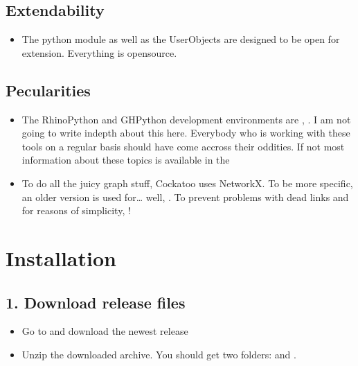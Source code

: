 \documentclass[letterpaper,10pt,english]{sphinxmanual}
\begin{document}
\subsection{Extendability}
\label{\detokenize{README:extendability}}\begin{itemize}
\item {} 
The python module as well as the UserObjects are designed to be open
for extension. Everything is open\sphinxhyphen{}source.

\end{itemize}


\subsection{Pecularities}
\label{\detokenize{README:pecularities}}\begin{itemize}
\item {} 
The RhinoPython and GHPython development environments are
,
.
I am not going to write in\sphinxhyphen{}depth about this here. Everybody who is
working with these tools on a regular basis should have come accross
their oddities. If not \sphinxhyphen{} most information about these topics is
available in the 

\item {} 
To do all the juicy graph stuff, Cockatoo uses NetworkX. To be more
specific, an older version \sphinxhyphen{}  is
used for… well,
.
To prevent problems with dead links and for reasons of simplicity,
!

\end{itemize}


\section{Installation}
\label{\detokenize{README:installation}}

\subsection{1. Download release files}
\label{\detokenize{README:download-release-files}}\label{\detokenize{README:id2}}\begin{itemize}
\item {} 
Go to  and
download the newest release

\item {} 
Unzip the downloaded archive. You should get two folders: 
and .

\end{itemize}
\end{document}
